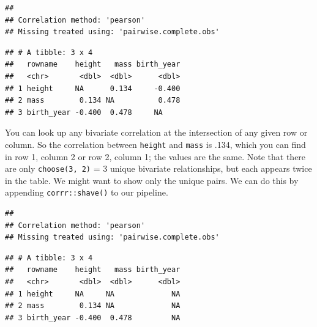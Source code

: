 \documentclass[]{book}
\newenvironment{Shaded}{\begin{snugshade}}{\end{snugshade}}
\newcommand{\KeywordTok}[1]{\textcolor[rgb]{0.13,0.29,0.53}{\textbf{#1}}}
\newcommand{\NormalTok}[1]{#1}
\newcommand{\OperatorTok}[1]{\textcolor[rgb]{0.81,0.36,0.00}{\textbf{#1}}}
\newcommand{\StringTok}[1]{\textcolor[rgb]{0.31,0.60,0.02}{#1}}
\begin{document}
\begin{Shaded}
\end{Shaded}

\begin{verbatim}
## 
## Correlation method: 'pearson'
## Missing treated using: 'pairwise.complete.obs'
\end{verbatim}

\begin{verbatim}
## # A tibble: 3 x 4
##   rowname    height   mass birth_year
##   <chr>       <dbl>  <dbl>      <dbl>
## 1 height     NA      0.134     -0.400
## 2 mass        0.134 NA          0.478
## 3 birth_year -0.400  0.478     NA
\end{verbatim}

You can look up any bivariate correlation at the intersection of any given row or column. So the correlation between \texttt{height} and \texttt{mass} is .134, which you can find in row 1, column 2 or row 2, column 1; the values are the same. Note that there are only \texttt{choose(3,\ 2)} = 3 unique bivariate relationships, but each appears twice in the table. We might want to show only the unique pairs. We can do this by appending \texttt{corrr::shave()} to our pipeline.

\begin{Shaded}
\end{Shaded}

\begin{verbatim}
## 
## Correlation method: 'pearson'
## Missing treated using: 'pairwise.complete.obs'
\end{verbatim}

\begin{verbatim}
## # A tibble: 3 x 4
##   rowname    height   mass birth_year
##   <chr>       <dbl>  <dbl>      <dbl>
## 1 height     NA     NA             NA
## 2 mass        0.134 NA             NA
## 3 birth_year -0.400  0.478         NA
\end{verbatim}
\end{document}
